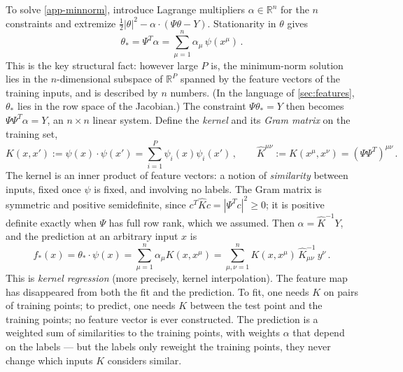 \documentclass[11pt]{article}
\newcommand{\R}{\mathbb{R}}
\begin{document}
To solve \eqref{app-minnorm}, introduce Lagrange multipliers $\alpha\in\R^n$ for the $n$ constraints and extremize $\frac{1}{2}|\theta|^2 - \alpha\cdot(\Psi\theta - Y)$. Stationarity in $\theta$ gives
%
\begin{equation}
    \theta_* = \Psi^T\alpha = \sum_{\mu=1}^n \alpha_\mu\,\psi(x^\mu)\,. \label{app-representer}
\end{equation}
%
This is the key structural fact: however large $P$ is, the minimum-norm solution lies in the $n$-dimensional subspace of $\R^P$ spanned by the feature vectors of the training inputs, and is described by $n$ numbers. (In the language of \cref{sec:features}, $\theta_*$ lies in the row space of the Jacobian.) The constraint $\Psi\theta_* = Y$ then becomes $\Psi\Psi^T\alpha = Y$, an $n\times n$ linear system. Define the \emph{kernel} and its \emph{Gram matrix} on the training set,
%
\begin{equation}
    K(x,x') := \psi(x)\cdot\psi(x') = \sum_{i=1}^P \psi_i(x)\psi_i(x')\,,\qquad
    \hat K^{\mu\nu} := K(x^\mu,x^\nu) = (\Psi\Psi^T)^{\mu\nu}\,. \label{app-kernel}
\end{equation}
%
The kernel is an inner product of feature vectors: a notion of \emph{similarity} between inputs, fixed once $\psi$ is fixed, and involving no labels. The Gram matrix is symmetric and positive semidefinite, since $c^T\hat K c = |\Psi^Tc|^2\geq 0$; it is positive definite exactly when $\Psi$ has full row rank, which we assumed. Then $\alpha = \hat K^{-1}Y$, and the prediction at an arbitrary input $x$ is
%
\begin{equation}
    f_*(x) = \theta_*\cdot\psi(x) = \sum_{\mu=1}^n \alpha_\mu K(x,x^\mu) = \sum_{\mu,\nu=1}^n K(x,x^\mu)\,\hat K^{-1}_{\mu\nu}\,y^\nu\,. \label{app-kernel-reg}
\end{equation}
%
This is \emph{kernel regression} (more precisely, kernel interpolation). The feature map has disappeared from both the fit and the prediction. To fit, one needs $K$ on pairs of training points; to predict, one needs $K$ between the test point and the training points; no feature vector is ever constructed. The prediction is a weighted sum of similarities to the training points, with weights $\alpha$ that depend on the labels --- but the labels only reweight the training points, they never change which inputs $K$ considers similar.
\end{document}
